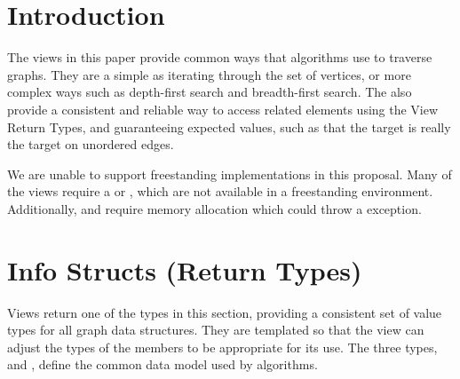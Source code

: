 
\clearpage

\section{Introduction}






%
%

The views in this paper provide common ways that algorithms use to traverse graphs. They are a simple as iterating 
through the set of vertices, or more complex ways such as depth-first search and breadth-first search. The also 
provide a consistent and reliable way to access related elements using the View Return Types, and guaranteeing expected 
values, such as that the target is really the target on unordered edges.

We are unable to support freestanding implementations in this proposal. Many of the
views require a  or , which are not available in a freestanding environment. 
Additionally,  and  require memory allocation which could throw a  
exception. 

\section{Info Structs (Return Types)}
Views return one of the types in this section, providing a consistent set of value types for all graph data structures. 
They are templated so that the view can adjust the types of the members to be appropriate for its use. The three types, 
 and , define the common data model used by algorithms.

